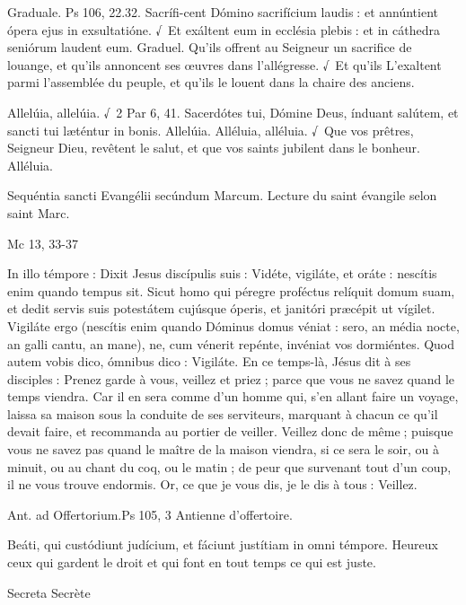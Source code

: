 \begin{paracol}{2}
Graduale. Ps 106, 22.32. Sacrífi-cent Dómino sacrifícium laudis : et annúntient ópera ejus in exsultatióne. √~Et exáltent eum in ecclésia plebis : et in cáthedra seniórum laudent eum.
\switchcolumn
Graduel. Qu’ils offrent au Seigneur un sacrifice de louange, et qu’ils annoncent ses œuvres dans l’allégresse. √~Et qu’ils L’exaltent parmi l’assemblée du peuple, et qu’ils le louent dans la chaire des anciens.
\switchcolumn*

Allelúia, allelúia. √~2 Par 6, 41. Sacerdótes tui, Dómine Deus, índuant salútem, et sancti tui læténtur in bonis. Allelúia.
\switchcolumn
Alléluia, alléluia. √~Que vos prêtres, Seigneur Dieu, revêtent le salut, et que vos saints jubilent dans le bonheur. Alléluia.
\switchcolumn*

Sequéntia sancti Evangélii secúndum Marcum.
\switchcolumn
Lecture du saint évangile selon saint Marc.
\switchcolumn*

Mc 13, 33-37
\switchcolumn

\switchcolumn*

In illo témpore : Dixit Jesus discípulis suis : Vidéte, vigiláte, et oráte : nescítis enim quando tempus sit. Sicut homo qui péregre proféctus relíquit domum suam, et dedit servis suis potestátem cujúsque óperis, et janitóri præcépit ut vígilet. Vigiláte ergo (nescítis enim quando Dóminus domus véniat : sero, an média nocte, an galli cantu, an mane), ne, cum vénerit repénte, invéniat vos dormiéntes. Quod autem vobis dico, ómnibus dico : Vigiláte.
\switchcolumn
En ce temps-là, Jésus dit à ses disciples : Prenez garde à vous, veillez et priez ; parce que vous ne savez quand le temps viendra. Car il en sera comme d’un homme qui, s’en allant faire un voyage, laissa sa maison sous la conduite de ses serviteurs, marquant à chacun ce qu’il devait faire, et recommanda au portier de veiller. Veillez donc de même ; puisque vous ne savez pas quand le maître de la maison viendra, si ce sera le soir, ou à minuit, ou au chant du coq, ou le matin ; de peur que survenant tout d’un coup, il ne vous trouve endormis. Or, ce que je vous dis, je le dis à tous : Veillez.
\switchcolumn*

Ant. ad Offertorium.\hfill Ps 105, 3
\switchcolumn
Antienne d’offertoire.
\switchcolumn*

Beáti, qui custódiunt judícium, et fáciunt justítiam in omni témpore.
\switchcolumn
Heureux ceux qui gardent le droit et qui font en tout temps ce qui est juste.
\switchcolumn*

Secreta
\switchcolumn
Secrète
\switchcolumn*


\end{paracol}
